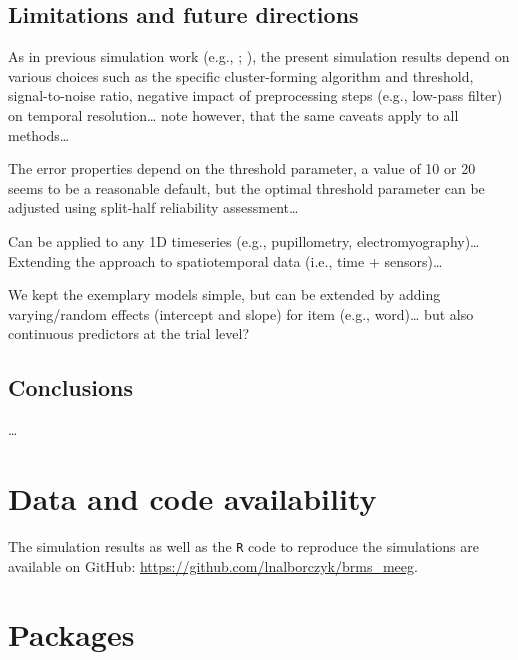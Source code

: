 \documentclass[
  doc,
  floatsintext,
  longtable,
  a4paper,
  nolmodern,
  notxfonts,
  notimes,
  colorlinks=true,linkcolor=blue,citecolor=blue,urlcolor=blue]{apa7}
\begin{document}
\subsection{Limitations and future
directions}\label{limitations-and-future-directions}

As in previous simulation work (e.g.,
;
), the
present simulation results depend on various choices such as the
specific cluster-forming algorithm and threshold, signal-to-noise ratio,
negative impact of preprocessing steps (e.g., low-pass filter) on
temporal resolution\ldots{} note however, that the same caveats apply to
all methods\ldots{}

The error properties depend on the threshold parameter, a value of 10 or
20 seems to be a reasonable default, but the optimal threshold parameter
can be adjusted using split-half reliability assessment\ldots{}

Can be applied to any 1D timeseries (e.g., pupillometry,
electromyography)\ldots{} Extending the approach to spatiotemporal data
(i.e., time + sensors)\ldots{}

We kept the exemplary models simple, but can be extended by adding
varying/random effects (intercept and slope) for item (e.g.,
word)\ldots{} but also continuous predictors at the trial level?

\subsection{Conclusions}\label{conclusions}

\ldots{}

\newpage

\section{Data and code availability}\label{data-and-code-availability}

The simulation results as well as the \texttt{R} code to reproduce the
simulations are available on GitHub:
\url{https://github.com/lnalborczyk/brms_meeg}.

\section{Packages}\label{packages}
\end{document}
